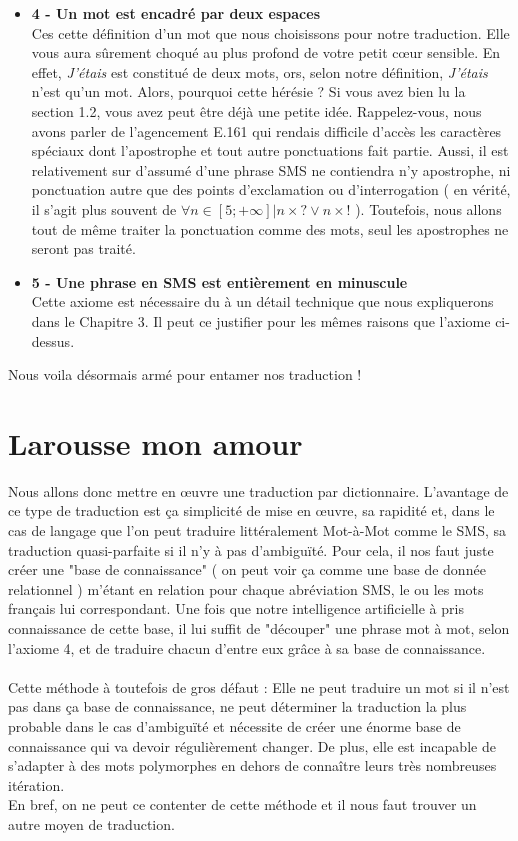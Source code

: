 \documentclass[11pt]{report}
\begin{document}
\begin{itemize}
		\item \textbf{4 - Un mot est encadré par deux espaces}\\
		Ces cette définition d'un mot que nous choisissons pour notre traduction. Elle vous aura sûrement choqué au plus profond de votre petit cœur sensible. En effet, {\em J'étais} est constitué de deux mots, ors, selon notre définition, {\em J'étais} n'est qu'un mot. Alors, pourquoi cette hérésie ? Si vous avez bien lu la section 1.2, vous avez peut être déjà une petite idée. Rappelez-vous, nous avons parler de l'agencement E.161 qui rendais difficile d'accès les caractères spéciaux dont l'apostrophe et tout autre ponctuations fait partie. Aussi, il est relativement sur d'assumé d'une phrase SMS ne contiendra n'y apostrophe, ni ponctuation autre que des points d'exclamation ou d'interrogation ( en vérité, il s'agit plus souvent de $ \forall n \in [5;+\infty] | n \times ? \vee n \times ! $ ). Toutefois, nous allons tout de même traiter la ponctuation comme des mots, seul les apostrophes ne seront pas traité.\\
		\item \textbf{5 - Une phrase en SMS est entièrement en minuscule}\\
		Cette axiome est nécessaire du à un détail technique que nous expliquerons dans le Chapitre 3. Il peut ce justifier pour les mêmes raisons que l'axiome ci-dessus.\\
	\end{itemize}
	
	Nous voila désormais armé pour entamer nos traduction !
	
	\section{Larousse mon amour}
	Nous allons donc mettre en œuvre une traduction par dictionnaire. L'avantage de ce type de traduction est ça simplicité de mise en œuvre, sa rapidité et, dans le cas de langage que l'on peut traduire littéralement Mot-à-Mot comme le SMS, sa traduction quasi-parfaite si il n'y à pas d'ambiguïté. Pour cela, il nos faut juste créer une "base de connaissance" ( on peut voir ça comme une base de donnée relationnel ) m'étant en relation pour chaque abréviation SMS, le ou les mots français lui correspondant. Une fois que notre intelligence artificielle à pris connaissance de cette base, il lui suffit de "découper" une phrase mot à mot, selon l'axiome 4, et de traduire chacun d'entre eux grâce à sa base de connaissance.
	\paragraph{}
	Cette méthode à toutefois de gros défaut : Elle ne peut traduire un mot si il n'est pas dans ça base de connaissance, ne peut déterminer la traduction la plus probable dans le cas d'ambiguïté et nécessite de créer une énorme base de connaissance qui va devoir régulièrement changer. De plus, elle est incapable de s'adapter à des mots polymorphes en dehors de connaître leurs très nombreuses itération.\\
	En bref, on ne peut ce contenter de cette méthode et il nous faut trouver un autre moyen de traduction.
	
\end{document}
